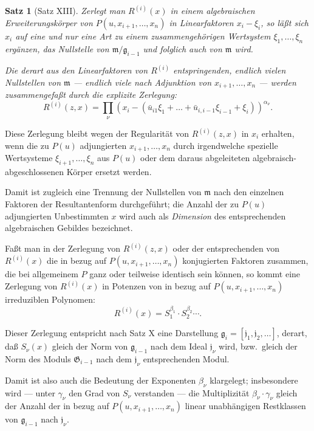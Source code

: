 \documentclass[fontsize=10pt,paper=a5,pagesize,headings=small]{scrbook}
\newcommand{\ideal}[1]{\mathfrak{#1}}
\theoremstyle{plain}
\newtheorem*{satz}{Satz}
\begin{document}
\begin{satz}[Satz XIII]
Zerlegt man $R^{(i)}(x)$ in einem algebraischen Erweiterungskörper von
$P(u, x_{i+1},\dots,x_n)$ in Linearfaktoren $x_i - \xi_i$, so läßt sich $x_i$ auf eine und nur
eine Art zu einem zusammengehörigen Wertsystem $\xi_1,\dots,\xi_n$ ergänzen, das
Nullstelle von $\ideal{m}/\ideal{g}_{i-1}$ und folglich auch von $\ideal{m}$ wird.

Die derart aus den Linearfaktoren von $R^{(i)}$ entspringenden, endlich vielen
Nullstellen von $\ideal{m}$ --- endlich viele nach Adjunktion von $x_{i+1},\dots,x_n$ --- werden
zusammengefaßt durch die explizite Zerlegung:
\begin{equation}
\label{eq:poly36}
R^{(i)}(z,x) = \prod_\nu (x_i - (\bar{u}_{i1}\xi_1 + \dots + \bar{u}_{i,i-1}\xi_{i-1} + \xi_i))^{\alpha_\nu}.
\end{equation}
\end{satz}

\newpage
\setcounter{page}{449}

Diese Zerlegung bleibt wegen der Regularität von $R^{(i)}(z,x)$ in $x_i$ erhalten,
wenn die zu $P(u)$ adjungierten $x_{i+1},\dots,x_n$ durch irgendwelche spezielle Wertsysteme
$\xi_{i+1},\dots,\xi_n$ aus $P(u)$ oder dem daraus abgeleiteten algebraisch-abgeschlossenen
Körper ersetzt werden.

Damit ist zugleich eine Trennung der Nullstellen von $\ideal{m}$ nach den einzelnen
Faktoren der Resultantenform durchgeführt; die Anzahl der zu $P(u)$ adjungierten
Unbestimmten $x$ wird auch als \textit{Dimension} des entsprechenden algebraischen Gebildes
bezeichnet.

Faßt man in der Zerlegung von $R^{(i)}(z,x)$ oder der entsprechenden von $R^{(i)}(x)$
die in bezug auf $P(u, x_{i+1},\dots,x_n)$ konjugierten Faktoren zusammen, die bei allgemeinem
$P$ ganz oder teilweise identisch sein können, so kommt eine Zerlegung von $R^{(i)}(x)$
in Potenzen von in bezug auf $P(u, x_{i+1},\dots,x_n)$ irreduziblen Polynomen:
\[ R^{(i)}(x) = S_1^{\beta_1} \cdot S_2^{\beta_2} \cdots. \]

Dieser Zerlegung entspricht nach Satz X eine Darstellung
$\ideal{g}_i = [\ideal{j}_1, \ideal{j}_2,\dots]$, derart, daß $S_\nu(x)$ gleich der Norm von $\ideal{g}_{i-1}$ nach dem Ideal
$\ideal{j}_\nu$ wird, bzw.~gleich der Norm des Moduls $\mathfrak{G}_{i-1}$ nach dem $\ideal{j}_\nu$ entsprechenden Modul.

Damit ist also auch die Bedeutung der Exponenten $\beta_\nu$ klargelegt; insbesondere
wird --- unter $\gamma_\nu$ den Grad von $S_\nu$ verstanden --- die Multiplizität $\beta_\nu \cdot \gamma_\nu$
gleich der Anzahl der in bezug auf $P(u, x_{i+1},\dots,x_n)$ linear unabhängigen Restklassen
von $\ideal{g}_{i-1}$ nach $\ideal{j}_\nu$.
\end{document}
